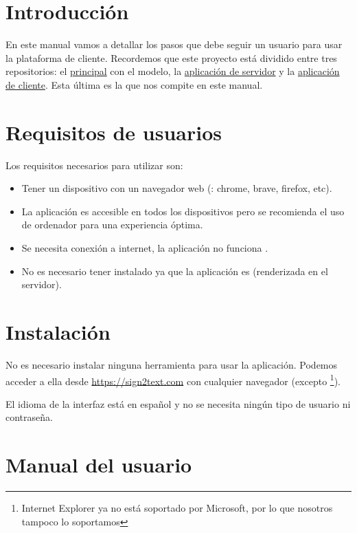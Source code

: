 

\section{Introducción}

En este manual vamos a detallar los pasos que debe seguir un usuario para usar la plataforma de cliente. Recordemos que este proyecto está dividido entre tres repositorios: el \href{https://github.com/irg1008/Sign2Text.git}{principal} con el modelo, la \href{https://github.com/irg1008/Sign2Text-API.git}{aplicación de servidor} y la \href{https://github.com/irg1008/Sign2Text-Astro.git}{aplicación de cliente}. Esta última es la que nos compite en este manual.

\section{Requisitos de usuarios}

Los requisitos necesarios para utilizar  son:

\begin{itemize}
  \item Tener un dispositivo con un navegador web (\pe: chrome, brave, firefox, etc).
  \item La aplicación es accesible en todos los dispositivos pero se recomienda el uso de ordenador para una experiencia óptima.
  \item Se necesita conexión a internet, la aplicación no funciona .
  \item No es necesario tener  instalado ya que la aplicación es  (renderizada en el servidor).
\end{itemize}

\section{Instalación}

No es necesario instalar ninguna herramienta para usar la aplicación. Podemos acceder a ella desde \url{https://sign2text.com} con cualquier navegador (excepto \footnote{Internet Explorer ya no está soportado por Microsoft, por lo que nosotros tampoco lo soportamos}).

El idioma de la interfaz está en español y no se necesita ningún tipo de usuario ni contraseña.

\section{Manual del usuario}

